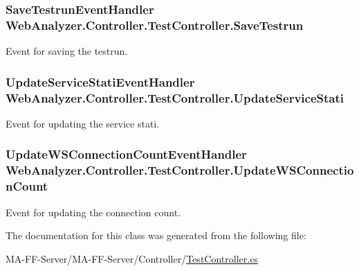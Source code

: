 \subsubsection[{Save\+Testrun}]{\setlength{\rightskip}{0pt plus 5cm}Save\+Testrun\+Event\+Handler Web\+Analyzer.\+Controller.\+Test\+Controller.\+Save\+Testrun}\label{class_web_analyzer_1_1_controller_1_1_test_controller_a45f8340dcea78391a3f58e5c7996d126}


Event for saving the testrun. 

\hypertarget{class_web_analyzer_1_1_controller_1_1_test_controller_aaf41a1a9569092d3c41a17a914607a7c}{}
\subsubsection[{Update\+Service\+Stati}]{\setlength{\rightskip}{0pt plus 5cm}Update\+Service\+Stati\+Event\+Handler Web\+Analyzer.\+Controller.\+Test\+Controller.\+Update\+Service\+Stati}\label{class_web_analyzer_1_1_controller_1_1_test_controller_aaf41a1a9569092d3c41a17a914607a7c}


Event for updating the service stati. 

\hypertarget{class_web_analyzer_1_1_controller_1_1_test_controller_a3b6d28efa43ed99a2bdf0db062ba46e1}{}
\subsubsection[{Update\+W\+S\+Connection\+Count}]{\setlength{\rightskip}{0pt plus 5cm}Update\+W\+S\+Connection\+Count\+Event\+Handler Web\+Analyzer.\+Controller.\+Test\+Controller.\+Update\+W\+S\+Connection\+Count}\label{class_web_analyzer_1_1_controller_1_1_test_controller_a3b6d28efa43ed99a2bdf0db062ba46e1}


Event for updating the connection count. 



The documentation for this class was generated from the following file\+:\begin{DoxyCompactItemize}
\item 
M\+A-\/\+F\+F-\/\+Server/\+M\+A-\/\+F\+F-\/\+Server/\+Controller/\hyperlink{_test_controller_8cs}{Test\+Controller.\+cs}\end{DoxyCompactItemize}
